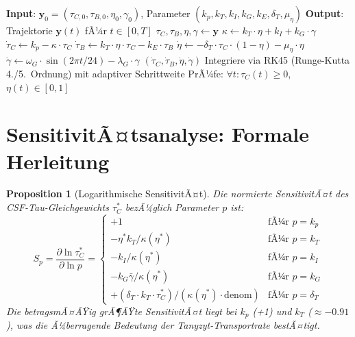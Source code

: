 ﻿\documentclass[12pt,a4paper]{article}
\newtheorem{proposition}[theorem]{Proposition}
\theoremstyle{definition}
\begin{document}
	\begin{algorithm}[H]
		\caption{Tau-Clearance ODE-Simulation (Pseudocode)}
		\label{alg:ode_sim}
		\begin{algorithmic}[1]
			\State \textbf{Input}: $\mathbf{y}_0 = (\tau_{C,0}, \tau_{B,0}, \eta_0, \gamma_0)$, Parameter $(k_p, k_T, k_I, k_G, k_E, \delta_T, \mu_\eta)$
			\State \textbf{Output}: Trajektorie $\mathbf{y}(t)$ fÃ¼r $t \in [0, T]$
			\State $\tau_C, \tau_B, \eta, \gamma \gets \mathbf{y}$
			\State $\kappa \gets k_T\cdot\eta + k_I + k_G\cdot\gamma$
			\State $\dot{\tau}_C \gets k_p - \kappa\cdot\tau_C$
			\State $\dot{\tau}_B \gets k_T\cdot\eta\cdot\tau_C - k_E\cdot\tau_B$
			\State $\dot{\eta} \gets -\delta_T\cdot\tau_C\cdot(1-\eta) - \mu_\eta\cdot\eta$
			\State $\dot{\gamma} \gets \omega_G\cdot\sin(2\pi t / 24) - \lambda_G\cdot\gamma$
			\Return $(\dot{\tau}_C, \dot{\tau}_B, \dot{\eta}, \dot{\gamma})$
			\EndFunction
			\State Integriere via \textsc{RK45} (Runge-Kutta 4./5.\ Ordnung) mit adaptiver Schrittweite
			\State PrÃ¼fe: $\forall t: \tau_C(t) \geq 0$, $\eta(t) \in [0,1]$
		\end{algorithmic}
	\end{algorithm}
	
	\section{SensitivitÃ¤tsanalyse: Formale Herleitung}
	
	\begin{proposition}[Logarithmische SensitivitÃ¤t]
		Die normierte SensitivitÃ¤t des CSF-Tau-Gleichgewichts $\tau_C^*$ bezÃ¼glich Parameter $p$ ist:
		\[
		S_p = \frac{\partial \ln \tau_C^*}{\partial \ln p} = \begin{cases}
			+1 & \text{fÃ¼r } p = k_p \\
			-\eta^* k_T / \kappa(\eta^*) & \text{fÃ¼r } p = k_T \\
			-k_I / \kappa(\eta^*) & \text{fÃ¼r } p = k_I \\
			-k_G\bar{\gamma} / \kappa(\eta^*) & \text{fÃ¼r } p = k_G \\
			+(\delta_T \cdot k_T \cdot \tau_C^*) / (\kappa(\eta^*)\cdot\text{denom}) & \text{fÃ¼r } p = \delta_T
		\end{cases}
		\]
		Die betragsmÃ¤ÃŸig grÃ¶ÃŸte SensitivitÃ¤t liegt bei $k_p$ (+1) und $k_T$ ($\approx -0.91$), was die Ã¼berragende Bedeutung der Tanyzyt-Transportrate bestÃ¤tigt.
	\end{proposition}
	
\end{document}
